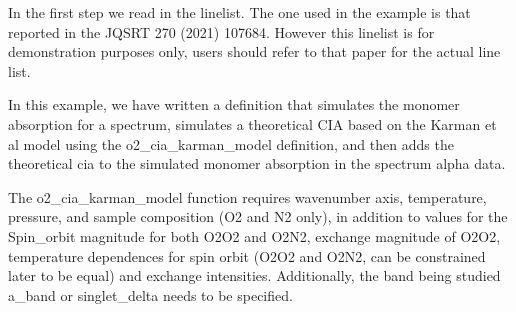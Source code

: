 \documentclass[letterpaper,10pt,english]{sphinxmanual}
\begin{document}
\sphinxAtStartPar
In the first step we read in the linelist. The one used in the example is that reported in the JQSRT 270 (2021) 107684. However this linelist is for demonstration purposes only, users should refer to that paper for the actual line list.

\begin{sphinxVerbatim}[commandchars=\\\{\}]
   
  \PYG{p}{[}\PYG{p}{]}
   
\end{sphinxVerbatim}

\sphinxAtStartPar
In this example, we have written a definition that simulates the monomer absorption for a spectrum, simulates a theoretical CIA based on the Karman et al model using the o2\_cia\_karman\_model definition, and then adds the theoretical cia to the simulated monomer absorption in the spectrum alpha data.

\sphinxAtStartPar
The o2\_cia\_karman\_model function requires wavenumber axis, temperature, pressure, and sample composition (O2 and N2 only), in addition to values for the Spin\_orbit magnitude for both O2\sphinxhyphen{}O2 and O2\sphinxhyphen{}N2, exchange magnitude of O2\sphinxhyphen{}O2, temperature dependences for spin orbit (O2\sphinxhyphen{}O2 and O2\sphinxhyphen{}N2, can be constrained later to be equal) and exchange intensities. Additionally, the band being studied a\_band or singlet\_delta needs to be specified.
\end{document}
